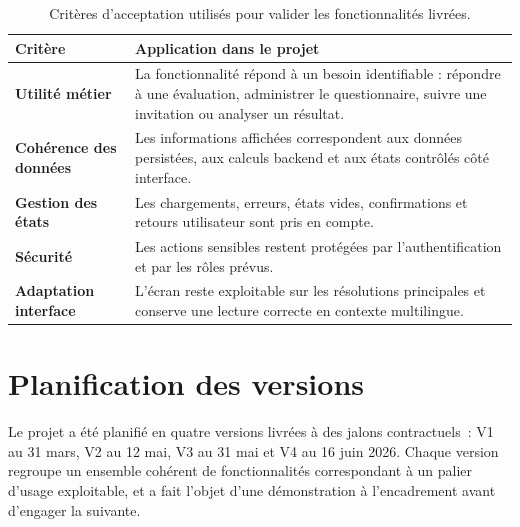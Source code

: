 \documentclass[12pt,a4paper]{report}
\begin{document}
\begin{table}[H]
\centering
\caption{Critères d'acceptation utilisés pour valider les fonctionnalités livrées.}
\begin{tabularx}{\textwidth}{>{\bfseries}L{4cm}Y}
\toprule
Critère & Application dans le projet \\
\midrule
Utilité métier & La fonctionnalité répond à un besoin identifiable : répondre à une évaluation, administrer le questionnaire, suivre une invitation ou analyser un résultat. \\
Cohérence des données & Les informations affichées correspondent aux données persistées, aux calculs backend et aux états contrôlés côté interface. \\
Gestion des états & Les chargements, erreurs, états vides, confirmations et retours utilisateur sont pris en compte. \\
Sécurité & Les actions sensibles restent protégées par l'authentification et par les rôles prévus. \\
Adaptation interface & L'écran reste exploitable sur les résolutions principales et conserve une lecture correcte en contexte multilingue. \\
\bottomrule
\end{tabularx}
\end{table}

\section{Planification des versions}
Le projet a été planifié en quatre versions livrées à des jalons contractuels~: V1 au 31 mars, V2 au 12 mai, V3 au 31 mai et V4 au 16 juin 2026. Chaque version regroupe un ensemble cohérent de fonctionnalités correspondant à un palier d'usage exploitable, et a fait l'objet d'une démonstration à l'encadrement avant d'engager la suivante.
\end{document}
